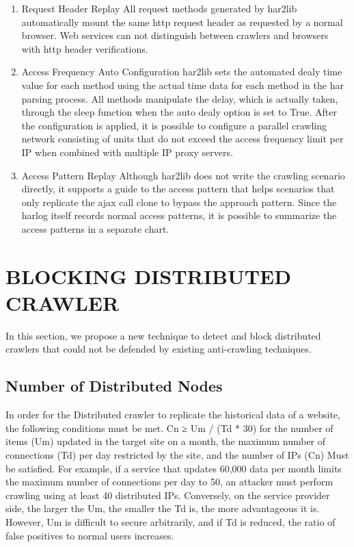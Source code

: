 \documentclass[letterpaper, 10 pt, conference]{ieeeconf}
\begin{document}
\begin{enumerate}
\item Request Header Replay
\newline All request methods generated by har2lib automatically mount the same http request header as requested by a normal browser. Web services can not distinguish between crawlers and browsers with http header verifications.
\newline
\item Access Frequency Auto Configuration
\newline 
har2lib sets the automated dealy time value for each method using the actual time data for each method in the har parsing process. All methods manipulate the delay, which is actually taken, through the sleep function when the auto dealy option is set to True. After the configuration is applied, it is possible to configure a parallel crawling network consisting of units that do not exceed the access frequency limit per IP when combined with multiple IP proxy servers.
\newline
\item Access Pattern Replay
\newline
Although har2lib does not write the crawling scenario directly, it supports a guide to the access pattern that helps scenarios that only replicate the ajax call clone to bypass the approach pattern. Since the harlog itself records normal access patterns, it is possible to summarize the access patterns in a separate chart.
\end{enumerate}



%
%
\section{BLOCKING DISTRIBUTED CRAWLER}
In this section, we propose a new technique to detect and block distributed crawlers that could not be defended by existing anti-crawling techniques.

\subsection{Number of Distributed Nodes}
In order for the Distributed crawler to replicate the historical data of a website, the following conditions must be met. Cn ≥ Um / (Td * 30) for the number of items (Um) updated in the target site on a month, the maximum number of connections (Td) per day restricted by the site, and the number of IPs (Cn) Must be satisfied.
For example, if a service that updates 60,000 data per month limits the maximum number of connections per day to 50, an attacker must perform crawling using at least 40 distributed IPs. Conversely, on the service provider side, the larger the Um, the smaller the Td is, the more advantageous it is. However, Um is difficult to secure arbitrarily, and if Td is reduced, the ratio of false positives to normal users increases.
\end{document}
